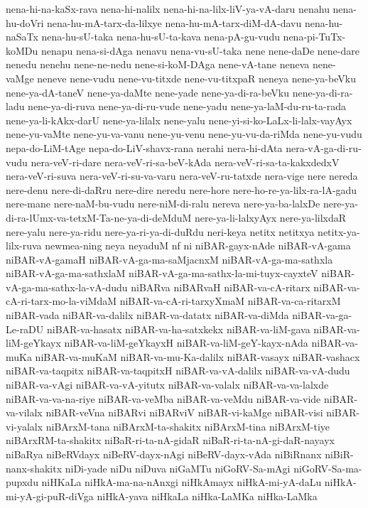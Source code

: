 {nena-hi-na-kaSx-rava
nena-hi-nalilx
nena-hi-na-lilx-liV-ya-vA-daru
nenahu
nena-hu-doVri
nena-hu-mA-tarx-da-lilxye
nena-hu-mA-tarx-diM-dA-davu
nena-hu-naSaTx
nena-hu-sU-taka
nena-hu-sU-ta-kava
nena-pA-gu-vudu
nena-pi-TuTx-koMDu
nenapu
nena-si-dAga
nenavu
nena-vu-sU-taka
nene
nene-daDe
nene-dare
nenedu
nenehu
nene-ne-nedu
nene-si-koM-DAga
nene-vA-tane
neneva
nene-vaMge
neneve
nene-vudu
nene-vu-titxde
nene-vu-titxpaR
neneya
nene-ya-beVku
nene-ya-dA-taneV
nene-ya-daMte
nene-yade
nene-ya-di-ra-beVku
nene-ya-di-ra-ladu
nene-ya-di-ruva
nene-ya-di-ru-vude
nene-yadu
nene-ya-laM-du-ru-ta-rada
nene-ya-li-kAkx-darU
nene-ya-lilalx
nene-yalu
nene-yi-si-ko-LaLx-li-lalx-vayAyx
nene-yu-vaMte
nene-yu-va-vanu
nene-yu-venu
nene-yu-vu-da-riMda
nene-yu-vudu
nepa-do-LiM-tAge
nepa-do-LiV-shavx-rana
nerahi
nera-hi-dAta
nera-vA-ga-di-ru-vudu
nera-veV-ri-dare
nera-veV-ri-sa-beV-kAda
nera-veV-ri-sa-ta-kakxdedxV
nera-veV-ri-suva
nera-veV-ri-su-va-varu
nera-veV-ru-tatxde
nera-vige
nere
nereda
nere-denu
nere-di-daRru
nere-dire
neredu
nere-hore
nere-ho-re-ya-lilx-ra-lA-gadu
nere-mane
nere-naM-bu-vudu
nere-niM-di-ralu
nereva
nere-ya-ba-lalxDe
nere-ya-di-ra-lUmx-va-tetxM-Ta-ne-ya-di-deMduM
nere-ya-li-lalxyAyx
nere-ya-lilxdaR
nere-yalu
nere-ya-ridu
nere-ya-ri-ya-di-duRdu
neri-keya
netitx
netitxya
netitx-ya-lilx-ruva
newmea-ning
neya
neyaduM
nf
ni
niBAR-gayx-nAde
niBAR-vA-gama
niBAR-vA-gamaH
niBAR-vA-ga-ma-saMjacnxM
niBAR-vA-ga-ma-sathxla
niBAR-vA-ga-ma-sathxlaM
niBAR-vA-ga-ma-sathx-la-mi-tuyx-cayxteV
niBAR-vA-ga-ma-sathx-la-vA-dudu
niBARva
niBARvaH
niBAR-va-cA-ritarx
niBAR-va-cA-ri-tarx-mo-la-viMdaM
niBAR-va-cA-ri-tarxyXmaM
niBAR-va-ca-ritarxM
niBAR-vada
niBAR-va-dalilx
niBAR-va-datatx
niBAR-va-diMda
niBAR-va-ga-Le-raDU
niBAR-va-hasatx
niBAR-va-ha-satxkekx
niBAR-va-liM-gava
niBAR-va-liM-geYkayx
niBAR-va-liM-geYkayxH
niBAR-va-liM-geY-kayx-nAda
niBAR-va-muKa
niBAR-va-muKaM
niBAR-va-mu-Ka-dalilx
niBAR-vasayx
niBAR-vashacx
niBAR-va-taqpitx
niBAR-va-taqpitxH
niBAR-va-vA-dalilx
niBAR-va-vA-dudu
niBAR-va-vAgi
niBAR-va-vA-yitutx
niBAR-va-valalx
niBAR-va-va-lalxde
niBAR-va-va-na-riye
niBAR-va-veMba
niBAR-va-veMdu
niBAR-va-vide
niBAR-va-vilalx
niBAR-veVna
niBARvi
niBARviV
niBAR-vi-kaMge
niBAR-visi
niBAR-vi-yalalx
niBArxM-tana
niBArxM-ta-shakitx
niBArxM-tina
niBArxM-tiye
niBArxRM-ta-shakitx
niBaR-ri-ta-nA-gidaR
niBaR-ri-ta-nA-gi-daR-nayayx
niBaRya
niBeRVdayx
niBeRV-dayx-nAgi
niBeRV-dayx-vAda
niBiRnanx
niBiR-nanx-shakitx
niDi-yade
niDu
niDuva
niGaMTu
niGoRV-Sa-mAgi
niGoRV-Sa-ma-pupxdu
niHKaLa
niHkA-ma-na-nAnxgi
niHkAmayx
niHkA-mi-yA-daLu
niHkA-mi-yA-gi-puR-diVga
niHkA-yava
niHkaLa
niHka-LaMKa
niHka-LaMka
}
